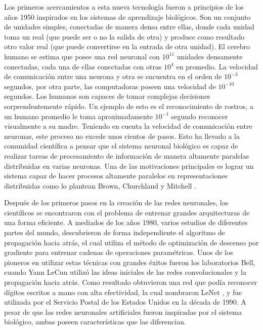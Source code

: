 Los primeros acercamientos a esta nueva tecnología fueron a principios de los a\~nos 1950 inspirados en los sistemas de aprendizaje biológicos. Son un conjunto de unidades simples, conectadas de manera densa entre ellas, donde cada unidad toma un real (que puede ser o no la salida de otra) y produce como resultado otro valor real (que puede convertirse en la entrada de otra unidad). El cerebro humano se estima que posee una red neuronal con $10^{11}$ unidades densamente conectadas, cada una de ellas conectadas con otras $10^{4}$ en promedio. La velocidad de comunicación entre una neurona y otra se encuentra en el orden de $10^{-3}$ segundos, por otra parte, las computadoras poseen una velocidad de $10^{-10}$ segundos. Los humanos son capaces de tomar complejas decisiones sorprendentemente rápido. Un ejemplo de esto es el reconocimiento de rostros, a un humano promedio le toma aproximadamente $10^{-1}$ segundo reconocer visualmente a su madre. Teniendo en cuenta la velocidad de comunicación entre neuronas, este proceso no excede unos cientos de pasos. Esto ha llevado a la comunidad científica a pensar que el sistema neuronal biológico es capaz de realizar tareas de procesamiento de información de manera altamente paralelas distribuidas en varias neuronas. Una de las motivaciones principales es lograr un sistema capaz de hacer procesos altamente paralelos en representaciones distribuidas como lo plantean Brown, Churchland y Mitchell \cite{brown1990learning,churchland1992computational,mitchell1997machine}.

Después de los primeros pasos en la creación de las redes neuronales, los científicos se encontraron con el problema de entrenar grandes arquitecturas de una forma eficiente. A mediados de los a\~nos 1980, varios estudios de diferentes partes del mundo, descubrieron de forma independiente el algoritmo de propagación hacia atrás, el cual utiliza el método de optimizaci\'on de descenso por gradiente para entrenar cadenas de operaciones param\'etricas. Unos de los pioneros en utilizar estas técnicas con grandes éxitos fueron los laboratorios Bell, cuando Yann LeCun utilizó las ideas iniciales de las redes convolucionales y la propagación hacia atrás. Como resultado obtuvieron una red que podía reconocer dígitos escritos a mano con alta efectividad, la cual nombraron LeNet \cite{lecun1995comparison}, y fue utilizada por el Servicio Postal de los Estados Unidos en la década de 1990. A pesar de que las redes neuronales artificiales fueron inspiradas por el sistema biológico, ambas poseen características que las diferencian.

